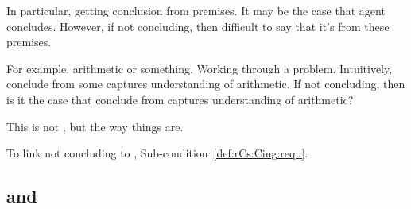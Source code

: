 \begin{note}
  In particular, getting conclusion from premises.
  It may be the case that agent concludes.
  However, if not concluding, then difficult to say that it's from these premises.

  For example, arithmetic or something.
  Working through a problem.
  Intuitively, conclude from some \pool{} captures understanding of arithmetic.
  If not concluding, then is it the case that conclude from \pool{} captures understanding of arithmetic?

  This is not \agpe{}, but the way things are.

  To link not concluding to \ros{}, Sub-condition~\ref{def:rCs:Cing:requ}.
\end{note}

\subsection{ and \qWhyV{}}

